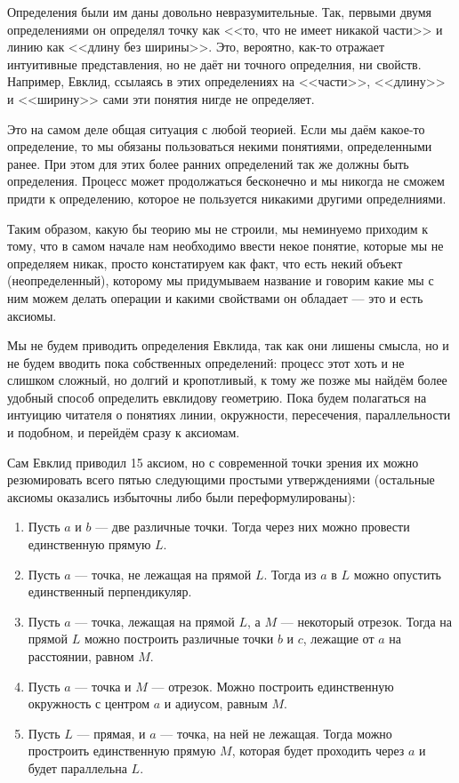 Определения были им даны довольно невразумительные. Так, первыми двумя определениями он определял точку как <<то, что не имеет никакой части>> и линию как <<длину без ширины>>. Это, вероятно, как-то отражает интуитивные представления, но не даёт ни точного определния, ни свойств. Например, Евклид, ссылаясь в этих определениях на <<части>>, <<длину>> и <<ширину>> сами эти понятия нигде не определяет.

Это на самом деле общая ситуация с любой теорией. Если мы даём какое-то определение, то мы обязаны пользоваться некими понятиями, определенными ранее. При этом для этих более ранних определений так же должны быть определения. Процесс может продолжаться бесконечно и мы никогда не сможем придти к определению, которое не пользуется никакими другими определниями.

Таким образом, какую бы теорию мы не строили, мы неминуемо приходим к тому, что в самом начале нам необходимо ввести некое понятие, которые мы не определяем никак, просто констатируем как факт, что есть некий объект (неопределенный), которому мы придумываем название и говорим какие мы с ним можем делать операции и какими свойствами он обладает --- это и есть аксиомы.

Мы не будем приводить определения Евклида, так как они лишены смысла, но и не будем вводить пока собственных определений: процесс этот хоть и не слишком сложный, но долгий и кропотливый, к тому же позже мы найдём более удобный способ определить евклидову геометрию. Пока будем полагаться на интуицию читателя о понятиях линии, окружности, пересечения, параллельности и подобном, и перейдём сразу к аксиомам.

Сам Евклид приводил 15 аксиом, но с современной точки зрения их можно резюмировать всего пятью следующими простыми утверждениями (остальные аксиомы оказались избыточны либо были переформулированы):

\begin{enumerate}
\item Пусть $a$ и $b$ --- две различные точки. Тогда через них можно провести единственную прямую $L$.
\item Пусть $a$ --- точка, не лежащая на прямой $L$. Тогда из $a$ в $L$ можно опустить единственный перпендикуляр.
\item Пусть $a$ --- точка, лежащая на прямой $L$, а $M$ --- некоторый отрезок. Тогда на прямой $L$ можно построить различные точки $b$ и $c$, лежащие от $a$ на расстоянии, равном $M$.
\item Пусть $a$ --- точка и $M$ --- отрезок. Можно построить единственную окружность с центром $a$ и адиусом, равным $M$.
\item Пусть $L$ --- прямая, и $a$ --- точка, на ней не лежащая. Тогда можно простроить единственную прямую $M$, которая будет проходить через $a$ и будет параллельна $L$.
\end{enumerate}

